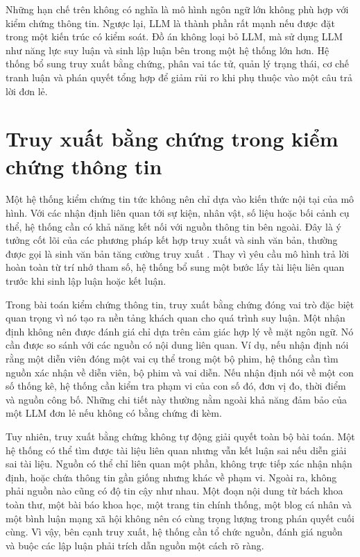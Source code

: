 ﻿\documentclass[oneside,a4paper,12pt]{extreport}
\begin{document}
Những hạn chế trên không có nghĩa là mô hình ngôn ngữ lớn không phù hợp với kiểm chứng thông tin. Ngược lại, LLM là thành phần rất mạnh nếu được đặt trong một kiến trúc có kiểm soát. Đồ án không loại bỏ LLM, mà sử dụng LLM như năng lực suy luận và sinh lập luận bên trong một hệ thống lớn hơn. Hệ thống bổ sung truy xuất bằng chứng, phân vai tác tử, quản lý trạng thái, cơ chế tranh luận và phán quyết tổng hợp để giảm rủi ro khi phụ thuộc vào một câu trả lời đơn lẻ.
\section{Truy xuất bằng chứng trong kiểm chứng thông tin}

Một hệ thống kiểm chứng tin tức không nên chỉ dựa vào kiến thức nội tại của mô hình. Với các nhận định liên quan tới sự kiện, nhân vật, số liệu hoặc bối cảnh cụ thể, hệ thống cần có khả năng kết nối với nguồn thông tin bên ngoài. Đây là ý tưởng cốt lõi của các phương pháp kết hợp truy xuất và sinh văn bản, thường được gọi là sinh văn bản tăng cường truy xuất \cite{lewis2020rag}. Thay vì yêu cầu mô hình trả lời hoàn toàn từ trí nhớ tham số, hệ thống bổ sung một bước lấy tài liệu liên quan trước khi sinh lập luận hoặc kết luận.

Trong bài toán kiểm chứng thông tin, truy xuất bằng chứng đóng vai trò đặc biệt quan trọng vì nó tạo ra nền tảng khách quan cho quá trình suy luận. Một nhận định không nên được đánh giá chỉ dựa trên cảm giác hợp lý về mặt ngôn ngữ. Nó cần được so sánh với các nguồn có nội dung liên quan. Ví dụ, nếu nhận định nói rằng một diễn viên đóng một vai cụ thể trong một bộ phim, hệ thống cần tìm nguồn xác nhận về diễn viên, bộ phim và vai diễn. Nếu nhận định nói về một con số thống kê, hệ thống cần kiểm tra phạm vi của con số đó, đơn vị đo, thời điểm và nguồn công bố. Những chi tiết này thường nằm ngoài khả năng đảm bảo của một LLM đơn lẻ nếu không có bằng chứng đi kèm.

Tuy nhiên, truy xuất bằng chứng không tự động giải quyết toàn bộ bài toán. Một hệ thống có thể tìm được tài liệu liên quan nhưng vẫn kết luận sai nếu diễn giải sai tài liệu. Nguồn có thể chỉ liên quan một phần, không trực tiếp xác nhận nhận định, hoặc chứa thông tin gần giống nhưng khác về phạm vi. Ngoài ra, không phải nguồn nào cũng có độ tin cậy như nhau. Một đoạn nội dung từ bách khoa toàn thư, một bài báo khoa học, một trang tin chính thống, một blog cá nhân và một bình luận mạng xã hội không nên có cùng trọng lượng trong phán quyết cuối cùng. Vì vậy, bên cạnh truy xuất, hệ thống cần tổ chức nguồn, đánh giá nguồn và buộc các lập luận phải trích dẫn nguồn một cách rõ ràng.
\end{document}
